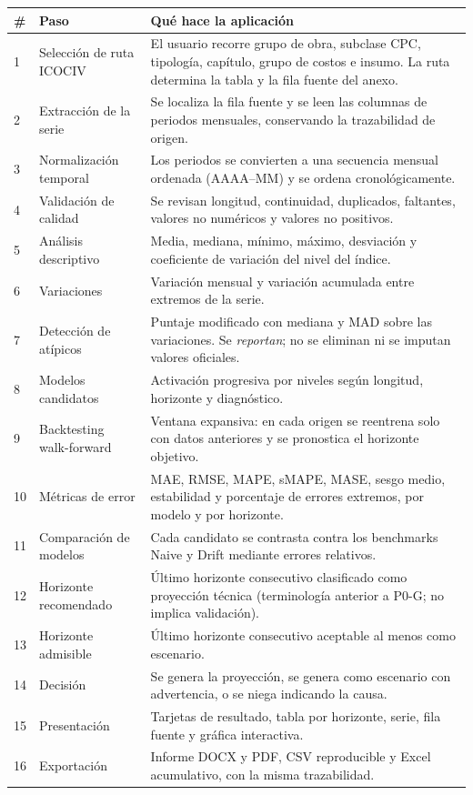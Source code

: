 \documentclass[11pt,letterpaper]{article}
\begin{document}
\begin{longtable}{@{}p{0.5cm}p{4.6cm}p{9.4cm}@{}}
\toprule
\textbf{\#} & \textbf{Paso} & \textbf{Qué hace la aplicación} \\
\midrule
\endhead
1 & Selección de ruta ICOCIV & El usuario recorre grupo de obra, subclase CPC, tipología, capítulo, grupo de costos e insumo. La ruta determina la tabla y la fila fuente del anexo. \\
2 & Extracción de la serie & Se localiza la fila fuente y se leen las columnas de periodos mensuales, conservando la trazabilidad de origen. \\
3 & Normalización temporal & Los periodos se convierten a una secuencia mensual ordenada (AAAA--MM) y se ordena cronológicamente. \\
4 & Validación de calidad & Se revisan longitud, continuidad, duplicados, faltantes, valores no numéricos y valores no positivos. \\
5 & Análisis descriptivo & Media, mediana, mínimo, máximo, desviación y coeficiente de variación del nivel del índice. \\
6 & Variaciones & Variación mensual y variación acumulada entre extremos de la serie. \\
7 & Detección de atípicos & Puntaje modificado con mediana y MAD sobre las variaciones. Se \emph{reportan}; no se eliminan ni se imputan valores oficiales. \\
8 & Modelos candidatos & Activación progresiva por niveles según longitud, horizonte y diagnóstico. \\
9 & Backtesting walk-forward & Ventana expansiva: en cada origen se reentrena solo con datos anteriores y se pronostica el horizonte objetivo. \\
10 & Métricas de error & MAE, RMSE, MAPE, sMAPE, MASE, sesgo medio, estabilidad y porcentaje de errores extremos, por modelo y por horizonte. \\
11 & Comparación de modelos & Cada candidato se contrasta contra los benchmarks Naive y Drift mediante errores relativos. \\
12 & Horizonte recomendado & Último horizonte consecutivo clasificado como proyección técnica (terminología anterior a P0-G; no implica validación). \\
13 & Horizonte admisible & Último horizonte consecutivo aceptable al menos como escenario. \\
14 & Decisión & Se genera la proyección, se genera como escenario con advertencia, o se niega indicando la causa. \\
15 & Presentación & Tarjetas de resultado, tabla por horizonte, serie, fila fuente y gráfica interactiva. \\
16 & Exportación & Informe DOCX y PDF, CSV reproducible y Excel acumulativo, con la misma trazabilidad. \\
\bottomrule
\end{longtable}
\end{document}
